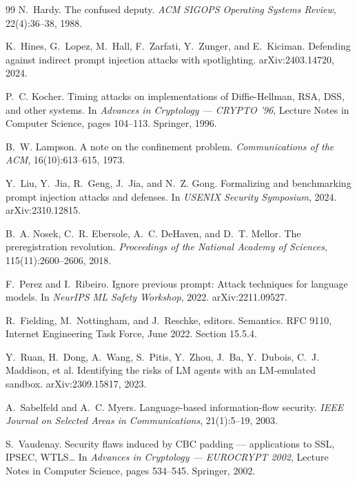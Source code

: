 \documentclass[11pt,oneside]{report}
\begin{document}
\begin{thebibliography}{99}
N.~Hardy.
\newblock The confused deputy.
\newblock \emph{ACM SIGOPS Operating Systems Review}, 22(4):36--38, 1988.

K.~Hines, G.~Lopez, M.~Hall, F.~Zarfati, Y.~Zunger, and E.~Kiciman.
\newblock Defending against indirect prompt injection attacks with
  spotlighting.
\newblock arXiv:2403.14720, 2024.

P.~C. Kocher.
\newblock Timing attacks on implementations of {Diffie-Hellman}, {RSA}, {DSS},
  and other systems.
\newblock In \emph{Advances in Cryptology --- CRYPTO '96}, Lecture Notes in
  Computer Science, pages 104--113. Springer, 1996.

B.~W. Lampson.
\newblock A note on the confinement problem.
\newblock \emph{Communications of the ACM}, 16(10):613--615, 1973.

Y.~Liu, Y.~Jia, R.~Geng, J.~Jia, and N.~Z. Gong.
\newblock Formalizing and benchmarking prompt injection attacks and defenses.
\newblock In \emph{USENIX Security Symposium}, 2024. arXiv:2310.12815.

B.~A. Nosek, C.~R. Ebersole, A.~C. DeHaven, and D.~T. Mellor.
\newblock The preregistration revolution.
\newblock \emph{Proceedings of the National Academy of Sciences},
  115(11):2600--2606, 2018.

F.~Perez and I.~Ribeiro.
\newblock Ignore previous prompt: Attack techniques for language models.
\newblock In \emph{NeurIPS ML Safety Workshop}, 2022. arXiv:2211.09527.

R.~Fielding, M.~Nottingham, and J.~Reschke, editors.
 Semantics.
\newblock RFC 9110, Internet Engineering Task Force, June 2022.
\newblock Section 15.5.4.

Y.~Ruan, H.~Dong, A.~Wang, S.~Pitis, Y.~Zhou, J.~Ba, Y.~Dubois, C.~J.
  Maddison, et al.
\newblock Identifying the risks of {LM} agents with an {LM}-emulated sandbox.
\newblock arXiv:2309.15817, 2023.

A.~Sabelfeld and A.~C. Myers.
\newblock Language-based information-flow security.
\newblock \emph{IEEE Journal on Selected Areas in Communications},
  21(1):5--19, 2003.

S.~Vaudenay.
\newblock Security flaws induced by {CBC} padding --- applications to {SSL},
  {IPSEC}, {WTLS}\ldots
\newblock In \emph{Advances in Cryptology --- EUROCRYPT 2002}, Lecture Notes in
  Computer Science, pages 534--545. Springer, 2002.


\end{thebibliography}
\end{document}
